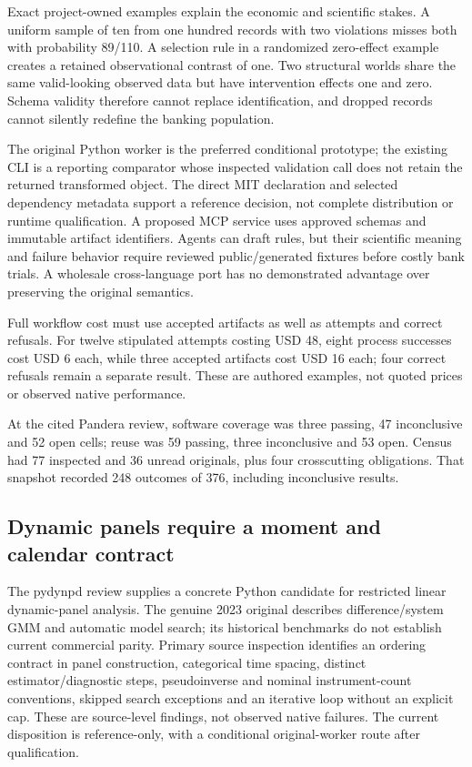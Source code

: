 Exact project-owned examples explain the economic and scientific stakes.
A uniform sample of ten from one hundred records with two violations
misses both with probability 89/110. A selection rule in a randomized
zero-effect example creates a retained observational contrast of one.
Two structural worlds share the same valid-looking observed data but
have intervention effects one and zero. Schema validity therefore cannot
replace identification, and dropped records cannot silently redefine the
banking population. \citep{exec24_pandera_reference}

The original Python worker is the preferred conditional prototype; the
existing CLI is a reporting comparator whose inspected validation call
does not retain the returned transformed object. The direct MIT
declaration and selected dependency metadata support a reference
decision, not complete distribution or runtime qualification. A proposed
MCP service uses approved schemas and immutable artifact identifiers.
Agents can draft rules, but their scientific meaning and failure
behavior require reviewed public/generated fixtures before costly bank
trials. A wholesale cross-language port has no demonstrated advantage
over preserving the original semantics. \citep{exec24_pandera_source}

Full workflow cost must use accepted artifacts as well as attempts and
correct refusals. For twelve stipulated attempts costing USD 48, eight
process successes cost USD 6 each, while three accepted artifacts cost
USD 16 each; four correct refusals remain a separate result. These are
authored examples, not quoted prices or observed native performance.
\citep{exec24_pandera_reference}

At the cited Pandera review, software coverage was three passing, 47
inconclusive and 52 open cells; reuse was 59 passing, three inconclusive
and 53 open. Census had 77 inspected and 36 unread originals, plus four
crosscutting obligations. That snapshot recorded 248 outcomes of 376,
including inconclusive results.
\citep{sp24pandera_reader,sp24pandera_progress}

\hypertarget{dynamic-panels-require-a-moment-and-calendar-contract}{%
\subsection{Dynamic panels require a moment and calendar
contract}\label{dynamic-panels-require-a-moment-and-calendar-contract}}

The pydynpd review supplies a concrete Python candidate for restricted
linear dynamic-panel analysis. The genuine 2023 original describes
difference/system GMM and automatic model search; its historical
benchmarks do not establish current commercial parity. Primary source
inspection identifies an ordering contract in panel construction,
categorical time spacing, distinct estimator/diagnostic steps,
pseudoinverse and nominal instrument-count conventions, skipped search
exceptions and an iterative loop without an explicit cap. These are
source-level findings, not observed native failures. The current
disposition is reference-only, with a conditional original-worker route
after qualification. \citep{exec24_pydynpd_paper,exec24_pydynpd_source}

